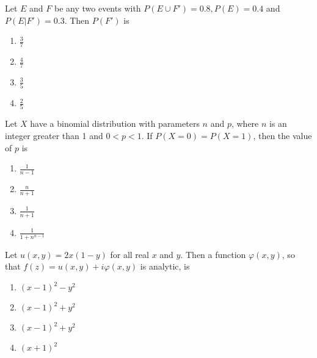 \iffalse
\chapter{2010}
\section{ma}
\author{EE24BTECH11030}
\fi
    \item Let $E$ and $F$ be any two events with $P(E \cup F') = 0.8, P(E) = 0.4$ and $P(E|F') = 0.3$. Then $P(F')$ is
    
    \begin{multicols}{4}
    \begin{enumerate}
        \item $\frac{3}{7}$
        \item $\frac{4}{7}$
        \item $\frac{3}{5}$
        \item $\frac{2}{5}$
    \end{enumerate}
    \end{multicols}

    \item Let $X$ have a binomial distribution with parameters $n$ and $p$, where $n$ is an integer greater than 1 and $0 < p < 1$. If $P(X = 0) = P(X = 1)$, then the value of $p$ is

    \begin{multicols}{4}
    \begin{enumerate}
        \item $\frac{1}{n-1}$
        \item $\frac{n}{n+1}$
        \item $\frac{1}{n+1}$
        \item $\frac{1}{1 + n^{n-1}}$
    \end{enumerate}
    \end{multicols}

    \item Let $u(x, y) = 2x(1 - y)$ for all real $x$ and $y$. Then a function $\varphi(x, y)$, so that $f(z) = u(x, y) + i\varphi(x, y)$ is analytic, is

    \begin{multicols}{4}
    \begin{enumerate}
        \item $(x - 1)^2 - y^2$
        \item $(x - 1)^2 + y^2$
        \item $(x - 1)^2 + y^2$
        \item $(x + 1)^2$
    \end{enumerate}
    \end{multicols}

